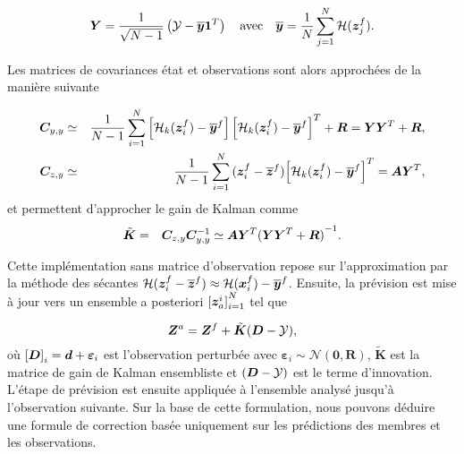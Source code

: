\begin{equation*}
    \bm Y = \frac{1}{\sqrt{N - 1}} \left(\mathcal Y - \overline{\bm{y}} \bm{1}^T \right) \quad \text{avec} \quad \overline{\bm{y}} = \frac{1}{N} \sum_{j=1}^{N} \mathcal{H}(\bm{z}_j^f).
\end{equation*}

Les matrices de covariances état et observations sont alors approchées de la manière suivante

\begin{eqnarray*}
    \bm C_{y, y} &\simeq& \frac{1}{N -1} \sum_{i = 1}^{N}\left[ \mathcal{H}_k(\bm{z}_i^f) - \overline{\bm{y}}^f\right] {\left[ \mathcal{H}_k(\bm{z}_i^f) - \overline{\bm{y}}^f\right]}^T + \bm R= \bm Y \bm Y^T + \bm R,\\
    \bm C_{z,y} &\simeq& \frac{1}{N - 1} \sum_{i = 1}^{N} {(\bm{z}_i^f - \overline{\bm{z}}^f)} {\left[ \mathcal{H}_k(\bm{z}_i^f) - \overline{\bm{y}}^f\right]}^T  = \bm A \bm Y^T, \\
\end{eqnarray*}
et permettent d'approcher le gain de Kalman comme
\begin{eqnarray*}
    \tilde{\bm{K}} &=& \bm C_{z,y} \bm C_{y,y}^{-1} \simeq \bm A \bm Y^T {(\bm Y \bm Y^T + \bm R)}^{-1}.
\end{eqnarray*}

Cette implémentation sans matrice d'observation repose sur l'approximation par la méthode des sécantes $\mathcal{H}(\bm{z}_i^f - \overline{\bm{z}}^f) \approx \mathcal{H} (\bm{x}_i^f) - \overline{\bm{y}}^f$.
Ensuite, la prévision est mise à jour vers un ensemble a posteriori ${[\bm{z}^i_a]}_{i=1}^{N}$ tel que

\begin{equation} \label{eq:enkf_formula}
    \bm{Z}^a = \bm{Z}^f + \tilde{\bm{K}} ( \bm{D} - \mathcal{Y}),
\end{equation}
où ${[\bm{D}]}_i = \bm{d} + \bm{\varepsilon}_i$ est l'observation perturbée avec $\bm{\varepsilon}_i \sim \mathcal{N}(\bm{0}, \bm R) $, $\tilde{\bm{K}}$ est la matrice de gain de Kalman ensembliste et $( \bm{D} - \mathcal{Y})$ est le terme d'innovation.
L'étape de prévision est ensuite appliquée à l'ensemble analysé jusqu'à l'observation suivante.
Sur la base de cette formulation, nous pouvons déduire une formule de correction basée uniquement sur les prédictions des membres et les observations.


